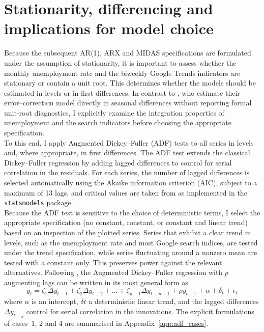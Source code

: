 \documentclass[12pt,a4paper]{article}
\begin{document}
\section{Stationarity, differencing and implications for model choice}
Because the subsequent AR(1), ARX and MIDAS specifications are formulated under the assumption of stationarity, it is important to assess whether the monthly unemployment rate and the biweekly Google Trends indicators are stationary or contain a unit root. This determines whether the models should be estimated in levels or in first differences. In contrast to \citet{Askitas}, who estimate their error–correction model directly in seasonal differences without reporting formal unit-root diagnostics, I explicitly examine the integration properties of unemployment and the search indicators before choosing the appropriate specification.\\
To this end, I apply Augmented Dickey--Fuller (ADF) tests to all series in levels and, where appropriate, in first differences. The ADF test extends the classical Dickey--Fuller regression by adding lagged differences to control for serial correlation in the residuals. For each series, the number of lagged differences is selected automatically using the Akaike information criterion (AIC), subject to a maximum of 13 lags, and critical values are taken from \citet{mckinnon} as implemented in the \texttt{statsmodels} package.\\
Because the ADF test is sensitive to the choice of deterministic terms, I select the appropriate specification (no constant, constant, or constant and linear trend) based on an inspection of the plotted series. Series that exhibit a clear trend in levels, such as the unemployment rate and most Google search indices, are tested under the trend specification, while series fluctuating around a nonzero mean are tested with a constant only. This preserves power against the relevant alternatives.
Following \citet[Table~17.3]{hamilton}, the Augmented Dickey--Fuller regression with $p$ augmenting lags can be written in its most general form as
\begin{equation}
y_t = \zeta_1 \Delta y_{t-1} + \zeta_2 \Delta y_{t-2} + \dots + \zeta_{p-1} \Delta y_{t-p+1} + \rho y_{t-1}+ \alpha + \delta_t + \epsilon_t
\label{eq:adf}
\end{equation}
where $\alpha$ is an intercept, $\delta t$ a deterministic linear trend, and the lagged differences $\Delta y_{t-j}$ control for serial correlation in the innovations. The explicit formulations of cases~1, 2 and 4 are summarised in Appendix~\ref{app:adf_cases}.\\
\end{document}
